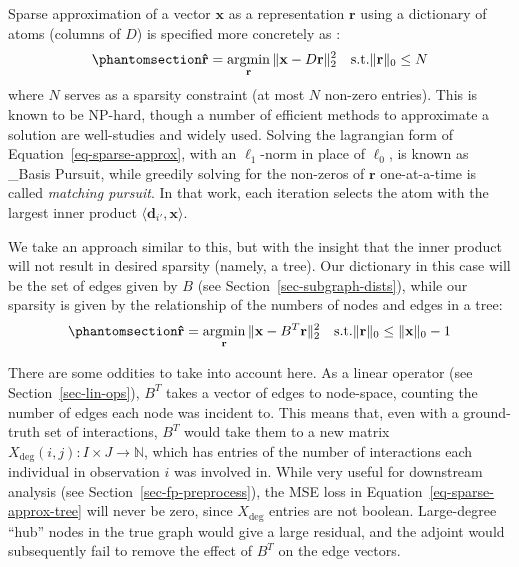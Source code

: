 \documentclass[%
	12pt,
		oneside,
		letterpaper
]{book}
\begin{document}
Sparse approximation of a vector \(\mathbf{x}\) as a representation
\(\mathbf{r}\) using a dictionary of atoms (columns of \(D\)) is
specified more concretely as
\autocite{EfficientimplementationK_Rubinstein2008}:
\begin{equation}\phantomsection\label{eq-sparse-approx}{\mathbf{\hat{r}} = \operatorname*{argmin}_{\mathbf{r}}{\|\mathbf{x}-D\mathbf{r} \|_2^2} \quad \text{s.t.} \|\mathbf{r}\|_0\leq N }\end{equation}
where \(N\) serves as a sparsity constraint (at most \(N\) non-zero
entries). This is known to be NP-hard, though a number of efficient
methods to approximate a solution are well-studies and widely used.
Solving the lagrangian form of Equation~\ref{eq-sparse-approx}, with an
\(\ell_1\)-norm in place of \(\ell_0\), is known as \_Basis
Pursuit\autocite{SparseApproximateSolutions_Natarajan1995}, while
greedily solving for the non-zeros of \(\mathbf{r}\) one-at-a-time is
called \emph{matching
pursuit}\autocite{Matchingpursuitstime_Mallat1993}. In that work, each
iteration selects the atom with the largest inner product
\(\langle \mathbf{d}_{i'},\mathbf{x}\rangle\).

We take an approach similar to this, but with the insight that the inner
product will not result in desired sparsity (namely, a tree). Our
dictionary in this case will be the set of edges given by \(B\) (see
Section~\ref{sec-subgraph-dists}), while our sparsity is given by the
relationship of the numbers of nodes and edges in a tree:
\begin{equation}\phantomsection\label{eq-sparse-approx-tree}{
\mathbf{\hat{r}} = \operatorname*{argmin}_{\mathbf{r}}{\|\mathbf{x}-B^T\mathbf{r} \|_2^2} \quad \text{s.t.} \|\mathbf{r}\|_0\leq \|\mathbf{x}\|_0 - 1
}\end{equation}

There are some oddities to take into account here. As a linear operator
(see Section~\ref{sec-lin-ops}), \(B^T\) takes a vector of edges to
node-space, counting the number of edges each node was incident to. This
means that, even with a ground-truth set of interactions, \(B^T\) would
take them to a new matrix
\(X_{\text{deg}}(i,j):I\times J \rightarrow \mathbb{N}\), which has
entries of the number of interactions each individual in observation
\(i\) was involved in. While very useful for downstream analysis (see
Section~\ref{sec-fp-preprocess}), the MSE loss in
Equation~\ref{eq-sparse-approx-tree} will never be zero, since
\(X_{\text{deg}}\) entries are not boolean. Large-degree ``hub'' nodes
in the true graph would give a large residual, and the adjoint would
subsequently fail to remove the effect of \(B^T\) on the edge vectors.
\end{document}
